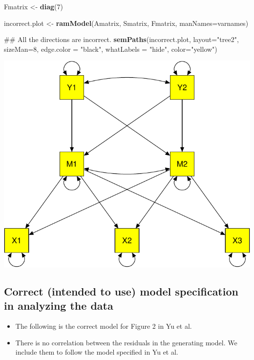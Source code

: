 \documentclass[]{article}
\newenvironment{Shaded}{\begin{snugshade}}{\end{snugshade}}
\newcommand{\KeywordTok}[1]{\textcolor[rgb]{0.13,0.29,0.53}{\textbf{#1}}}
\newcommand{\DataTypeTok}[1]{\textcolor[rgb]{0.13,0.29,0.53}{#1}}
\newcommand{\DecValTok}[1]{\textcolor[rgb]{0.00,0.00,0.81}{#1}}
\newcommand{\StringTok}[1]{\textcolor[rgb]{0.31,0.60,0.02}{#1}}
\newcommand{\NormalTok}[1]{#1}
\providecommand{\tightlist}{%
  \setlength{\itemsep}{0pt}\setlength{\parskip}{0pt}}
\begin{document}
\begin{Shaded}
\begin{Highlighting}[]
\NormalTok{Fmatrix <-}\StringTok{ }\KeywordTok{diag}\NormalTok{(}\DecValTok{7}\NormalTok{)}

\NormalTok{incorrect.plot <-}\StringTok{ }\KeywordTok{ramModel}\NormalTok{(Amatrix, Smatrix, Fmatrix, }\DataTypeTok{manNames=}\NormalTok{varnames)}

\NormalTok{## All the directions are incorrect.}
\KeywordTok{semPaths}\NormalTok{(incorrect.plot, }\DataTypeTok{layout=}\StringTok{"tree2"}\NormalTok{, }\DataTypeTok{sizeMan=}\DecValTok{8}\NormalTok{, }\DataTypeTok{edge.color =} \StringTok{"black"}\NormalTok{, }
         \DataTypeTok{whatLabels =} \StringTok{"hide"}\NormalTok{, }\DataTypeTok{color=}\StringTok{"yellow"}\NormalTok{)}
\end{Highlighting}
\end{Shaded}

\includegraphics{Supplemental_materials_3_files/figure-latex/unnamed-chunk-13-1.pdf}

\subsection{Correct (intended to use) model specification in analyzing
the
data}\label{correct-intended-to-use-model-specification-in-analyzing-the-data-1}

\begin{itemize}
\tightlist
\item
  The following is the correct model for Figure 2 in Yu et al.
\item
  There is no correlation between the residuals in the generating model.
  We include them to follow the model specified in Yu et al.
\end{itemize}
\end{document}
